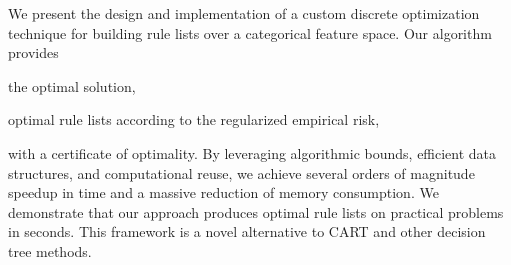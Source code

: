 We present the design and implementation of a custom discrete optimization
technique for building rule lists over a categorical feature space.
%
Our algorithm provides
\begin{kdd}
the optimal solution,
\end{kdd}
\begin{arxiv}
optimal rule lists according to the regularized empirical risk,
\end{arxiv}
with a certificate of optimality.
%
By leveraging algorithmic bounds, efficient data structures,
and computational reuse, we achieve several orders of magnitude speedup in time
and a massive reduction of memory consumption.
%
We demonstrate that our approach produces optimal rule lists on practical
problems in seconds.
%
This framework is a novel alternative to CART and other decision tree methods.
